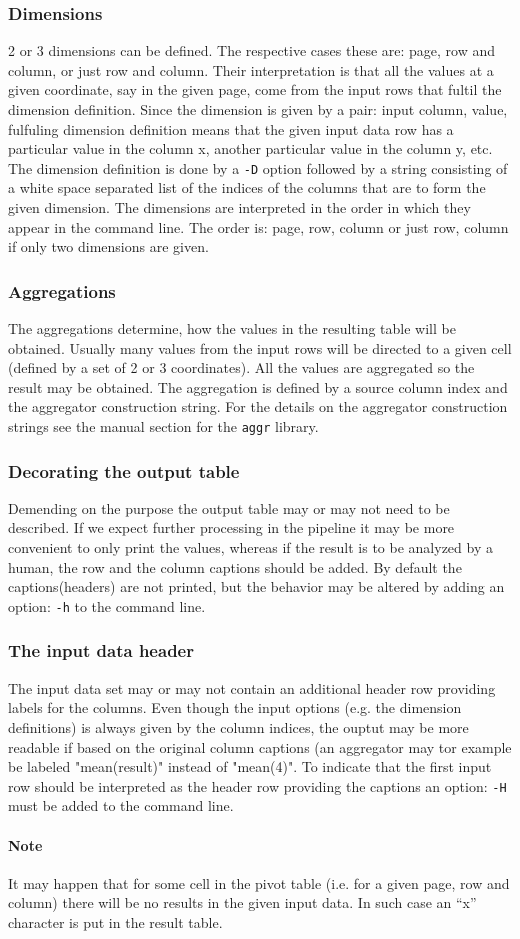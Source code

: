 \documentclass{report}
\begin{document}
	\subsubsection{Dimensions}
	2 or 3 dimensions can be defined. The respective cases these are: page, row
	and column, or just row and column. Their interpretation is that all the values
	at a given coordinate, say in the given page, come from the input rows that fultil
	the dimension definition. Since the dimension is given by a pair: input column,
	value, fulfuling dimension definition means that the given input data row has
	a particular value in the column x, another particular value in the column y, etc.
	The dimension definition is done by a \texttt{-D} option followed by a string
	consisting of a white space separated list of the indices of the columns that are
	to form the given dimension. The dimensions are interpreted in the order in which
	they appear in the command line. The order is: page, row, column or just row, column
	if only two dimensions are given.

	\subsubsection{Aggregations}
	The aggregations determine, how the values in the resulting table will be obtained.
	Usually many values from the input rows will be directed to a given cell (defined
	by a set of 2 or 3 coordinates). All the values are aggregated so the result may
	be obtained. The aggregation is defined by a source column index and the aggregator
	construction string. For the details on the aggregator construction strings see
	the manual section for the \texttt{aggr} library.

	\subsubsection{Decorating the output table}
	Demending on the purpose the output table may or may not need to be described. If
	we expect further processing in the pipeline it may be more convenient to only
	print the values, whereas if the result is to be analyzed by a human, the row and
	the column captions should be added. By default the captions(headers) are not
	printed, but the behavior may be altered by adding an option: \texttt{-h} to the
	command line.

	\subsubsection{The input data header}
	The input data set may or may not contain an additional header row providing
	labels for the columns. Even though the input options (e.g. the dimension
	definitions) is always given by the column indices, the ouptut may be more
	readable if based on the original column captions (an aggregator may tor example
	be labeled "mean(result)" instead of "mean(4)". To indicate that the first input
	row should be interpreted as the header row providing the captions an option:
	\texttt{-H} must be added to the command line.

	\paragraph{Note}
	It may happen that for some cell in the pivot table (i.e. for a given page, row
	and column) there will be no results in the given input data. In such case an
	``x'' character is put in the result table.
\end{document}
